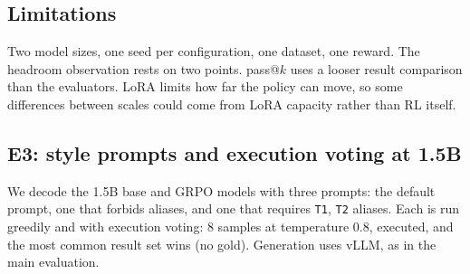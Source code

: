 \documentclass[11pt]{article}
\begin{document}
\subsection{Limitations}

Two model sizes, one seed per configuration, one dataset, one reward. The
headroom observation rests on two points. pass@$k$ uses a looser result
comparison than the evaluators. LoRA limits how far the policy can move, so some
differences between scales could come from LoRA capacity rather than RL itself.

\subsection{E3: style prompts and execution voting at 1.5B}
\label{sec:e3}

We decode the 1.5B base and GRPO models with three prompts: the default prompt,
one that forbids aliases, and one that requires \texttt{T1}, \texttt{T2}
aliases. Each is run greedily and with execution voting: 8 samples at
temperature 0.8, executed, and the most common result set wins (no gold).
Generation uses vLLM, as in the main evaluation.
\end{document}
